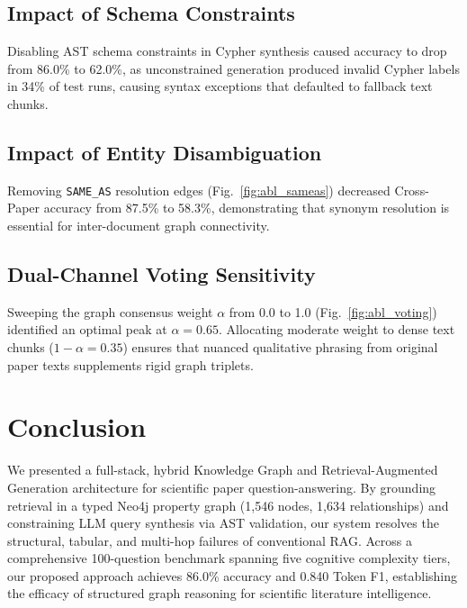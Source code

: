 \documentclass[conference]{IEEEtran}
\begin{document}
\subsection{Impact of Schema Constraints}
Disabling AST schema constraints in Cypher synthesis caused accuracy to drop from 86.0\% to 62.0\%, as unconstrained generation produced invalid Cypher labels in 34\% of test runs, causing syntax exceptions that defaulted to fallback text chunks.

\subsection{Impact of Entity Disambiguation}
Removing \texttt{SAME\_AS} resolution edges (Fig.~\ref{fig:abl_sameas}) decreased Cross-Paper accuracy from 87.5\% to 58.3\%, demonstrating that synonym resolution is essential for inter-document graph connectivity.

\subsection{Dual-Channel Voting Sensitivity}
Sweeping the graph consensus weight $\alpha$ from 0.0 to 1.0 (Fig.~\ref{fig:abl_voting}) identified an optimal peak at $\alpha = 0.65$. Allocating moderate weight to dense text chunks ($1 - \alpha = 0.35$) ensures that nuanced qualitative phrasing from original paper texts supplements rigid graph triplets.

\section{Conclusion}
\label{sec:conclusion}
We presented a full-stack, hybrid Knowledge Graph and Retrieval-Augmented Generation architecture for scientific paper question-answering. By grounding retrieval in a typed Neo4j property graph (1,546 nodes, 1,634 relationships) and constraining LLM query synthesis via AST validation, our system resolves the structural, tabular, and multi-hop failures of conventional RAG. Across a comprehensive 100-question benchmark spanning five cognitive complexity tiers, our proposed approach achieves 86.0\% accuracy and 0.840 Token F1, establishing the efficacy of structured graph reasoning for scientific literature intelligence.



\end{document}
